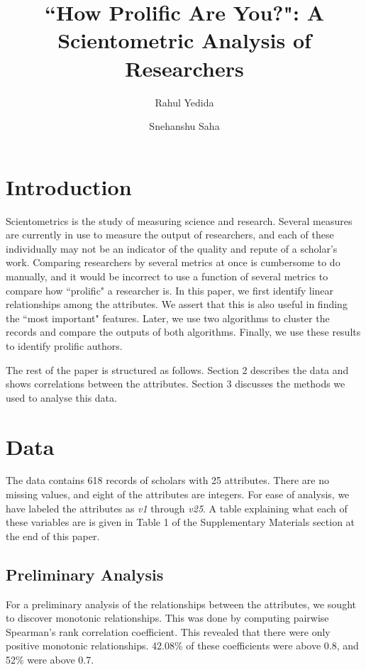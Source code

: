 \documentclass[12pt,a4paper,twocolumn]{article}
\title{``How Prolific Are You?": A Scientometric Analysis of Researchers}
\author[1]{Rahul Yedida}
\author[1]{Snehanshu Saha}
\affil[1]{Department of Computer Science \& Engineering, PESIT South Campus}
\date{}
\begin{document}
\maketitle


\section{Introduction}
Scientometrics is the study of measuring science and research. Several measures are currently in use to measure the output of researchers, and each of these individually may not be an indicator of the quality and repute of a scholar's work. Comparing researchers by several metrics at once is cumbersome to do manually, and it would be incorrect to use a function of several metrics to compare how ``prolific" a researcher is. In this paper, we first identify linear relationships among the attributes. We assert that this is also useful in finding the ``most important" features. Later, we use two algorithms to cluster the records and compare the outputs of both algorithms. Finally, we use these results to identify prolific authors. 

The rest of the paper is structured as follows. Section 2 describes the data and shows correlations between the attributes. Section 3 discusses the methods we used to analyse this data.

\section{Data}
The data contains 618 records of scholars with 25 attributes. There are no missing values, and eight of the attributes are integers. For ease of analysis, we have labeled the attributes as \textit{v1} through \textit{v25}. A table explaining what each of these variables are is given in Table 1 of the Supplementary Materials section at the end of this paper.

\subsection{Preliminary Analysis}
For a preliminary analysis of the relationships between the attributes, we sought to discover monotonic relationships. This was done by computing pairwise Spearman's rank correlation coefficient. This revealed that there were only positive monotonic relationships. 42.08\% of these coefficients were above 0.8, and 52\% were above 0.7.
\end{document}
